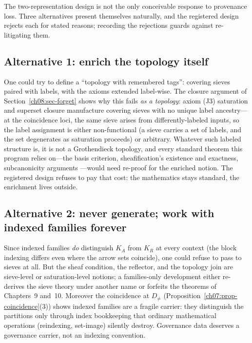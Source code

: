 The two-representation design is not the only conceivable response to provenance loss. Three alternatives present themselves naturally, and the registered design rejects each for stated reasons; recording the rejections guards against re-litigating them.

\subsection{Alternative 1: enrich the topology itself}
One could try to define a ``topology with remembered tags'': covering sieves paired with labels, with the axioms extended label-wise. The closure argument of Section~\ref{ch08:sec-forget} shows why this fails \emph{as a topology}: axiom (J3) saturation and superset closure manufacture covering sieves with no unique label ancestry---at the coincidence loci, the same sieve arises from differently-labeled inputs, so the label assignment is either non-functional (a sieve carries a set of labels, and the set degenerates as saturation proceeds) or arbitrary. Whatever such labeled structure is, it is not a Grothendieck topology, and every standard theorem this program relies on---the basis criterion, sheafification's existence and exactness, subcanonicity arguments \cite{maclane, stacks00ZC, stacks00W1}---would need re-proof for the enriched notion. The registered design refuses to pay that cost: the mathematics stays standard, the enrichment lives outside.

\subsection{Alternative 2: never generate; work with indexed families forever}
Since indexed families \emph{do} distinguish $K_{A}$ from $K_{R}$ at every context (the block indexing differs even where the arrow sets coincide), one could refuse to pass to sieves at all. But the sheaf condition, the reflector, and the topology join are sieve-level or saturation-level notions; a families-only development either re-derives the sieve theory under another name or forfeits the theorems of Chapters~9 and~10. Moreover the coincidence at $D_{\neq}$ (Proposition~\ref{ch07:prop-coincidence}(3)) shows indexed families are a fragile carrier: they distinguish the partitions only through index bookkeeping that ordinary mathematical operations (reindexing, set-image) silently destroy. Governance data deserves a governance carrier, not an indexing convention.

